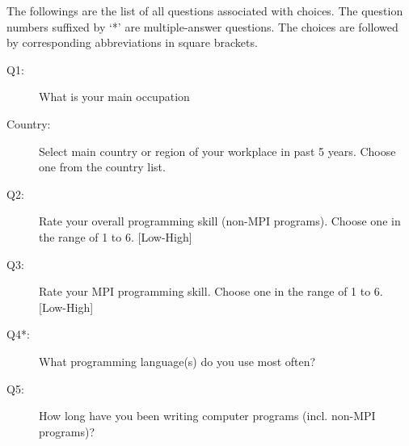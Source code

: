 \documentclass[conference,10pt,letterpaper]{IEEEtran}
\def\myquote#1{`#1'}
\begin{document}
{\small

  The followings are the list of all questions associated with
choices. The question numbers suffixed by \myquote{*} are
multiple-answer questions. The choices are followed by corresponding
abbreviations in square brackets.
\vspace{3mm}
{\scriptsize
  \begin{description}
  \item[Q1:] What is your main occupation
  \item[Country:] \hspace{3mm}Select main country or region of your workplace in past 5 years.
    Choose one from the country list.
  \item[Q2:] Rate your overall programming skill (non-MPI programs).
    Choose one in the range of 1 to 6. [Low-High]
  \item[Q3:] Rate your MPI programming skill.
    Choose one in the range of 1 to 6. [Low-High]
  \item[Q4*:] What programming language(s) do you use most often?
  \item[Q5:] How long have you been writing computer programs (incl. non-MPI programs)?
\end{description}}}
\end{document}
